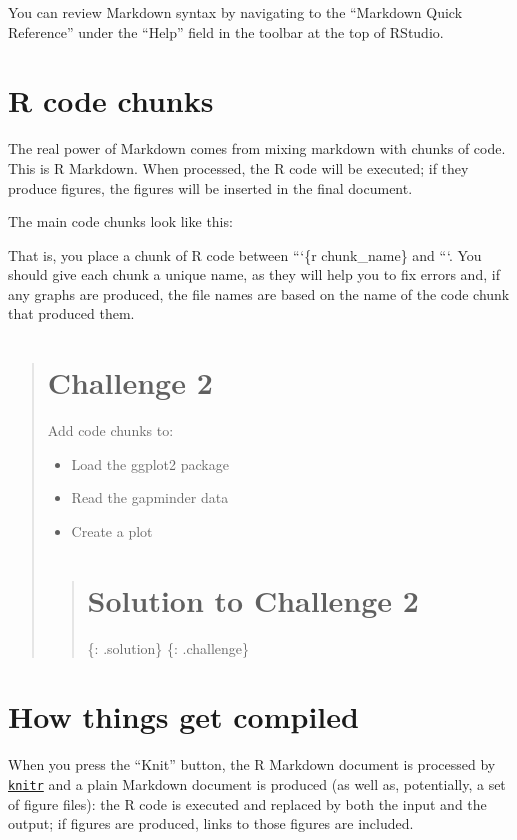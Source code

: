 \documentclass[]{book}
\providecommand{\tightlist}{%
  \setlength{\itemsep}{0pt}\setlength{\parskip}{0pt}}
\begin{document}
You can review Markdown syntax by navigating to the ``Markdown Quick
Reference'' under the ``Help'' field in the toolbar at the top of
RStudio.

\section{R code chunks}\label{r-code-chunks}

The real power of Markdown comes from mixing markdown with chunks of
code. This is R Markdown. When processed, the R code will be executed;
if they produce figures, the figures will be inserted in the final
document.

The main code chunks look like this:

That is, you place a chunk of R code between ```\{r chunk\_name\} and
```. You should give each chunk a unique name, as they will help you to
fix errors and, if any graphs are produced, the file names are based on
the name of the code chunk that produced them.

\begin{quote}
\section{Challenge 2}\label{challenge-2-2}

Add code chunks to:

\begin{itemize}
\tightlist
\item
  Load the ggplot2 package
\item
  Read the gapminder data
\item
  Create a plot
\end{itemize}

\begin{quote}
\section{Solution to Challenge 2}\label{solution-to-challenge-2-2}

\{: .solution\} \{: .challenge\}
\end{quote}
\end{quote}

\section{How things get compiled}\label{how-things-get-compiled}

When you press the ``Knit'' button, the R Markdown document is processed
by \href{http://yihui.name/knitr}{\texttt{knitr}} and a plain Markdown
document is produced (as well as, potentially, a set of figure files):
the R code is executed and replaced by both the input and the output; if
figures are produced, links to those figures are included.
\end{document}
